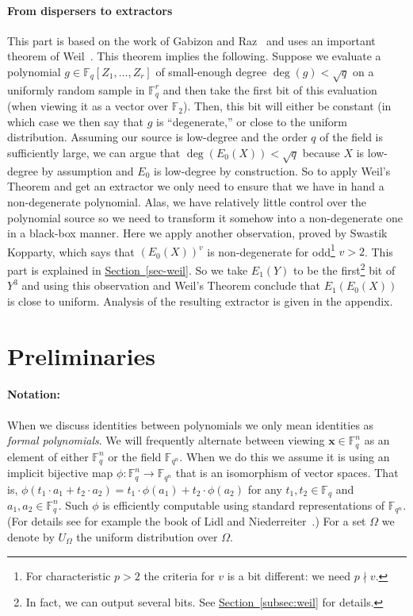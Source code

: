 \documentclass[10pt]{article}
\theoremstyle{definition}
\numberwithin{equation}{section}
\newcommand{\expref}[2]{\texorpdfstring{\hyperref[#2]{#1~\ref{#2}}}{#1~\ref{#2}}}
\newcommand{\F}{\mathbb F_q}
\newcommand{\Fn}{\mathbb F_{q^n}}
\newcommand{\x}{\textbf{x}}
\begin{document}
\paragraph{From dispersers to extractors}
This part is based on the work of Gabizon and Raz~\cite{GR08} and uses
%
an important theorem of Weil~\cite{Weil48}.
This theorem implies the following. Suppose we evaluate a polynomial $g\in \F[Z_1,\ldots,Z_r]$ of small-enough degree $\deg(g)<\sqrt q $
on a uniformly random sample in $\F^r$ and then take the first bit of this evaluation (when viewing it as a vector over $\mathbb{F}_2$).
%
%
%
Then, this bit will either be constant (in which case we then say
%
%
that $g$ is ``degenerate,'' or close to the uniform distribution.
%
 Assuming our source is low-degree and the
%
%
order $q$ of the field
is sufficiently large, we %
can argue that $\deg(E_0(X))<\sqrt q$ because $X$ is
low-degree by assumption and $E_0$ is low-degree by construction. So to apply Weil's Theorem and get an extractor we only need to ensure that we have in hand
a non-degenerate polynomial. Alas, we have relatively little control over the polynomial source so
we %
need to transform it somehow into a non-degenerate one in a
 black-box manner.
Here we apply another observation,
%
%
proved by Swastik Kopparty,
which says that $(E_0(X))^v$ is non-degenerate for
odd\footnote{For characteristic $p>2$ the criteria for $v$ is a bit different:
we need
%
$p\nmid v$.} $v>2$.
 This part is explained in \expref{Section}{sec-weil}. So we take $E_1(Y)$ to be the first\footnote{In fact, we can  output several bits. See \expref{Section}{subsec:weil} for details.}  bit of $Y^3$ and using this observation and Weil's Theorem conclude
 that $E_1(E_0(X))$ is close to uniform. Analysis of the resulting extractor is given in the appendix.

\section{Preliminaries}\label{sec-prelim}
\paragraph{Notation:}
When we discuss identities between polynomials we
only mean identities as \emph{formal polynomials}.
We will frequently alternate between viewing $\x\in \F^n$ as an element of
either $\F^n$ or the field $\Fn$.
When we do this we assume it is using an implicit bijective map $\phi:\F^n\to \Fn$ that is
an isomorphism of vector spaces.
That is, $\phi(t_1\cdot a_1+t_2\cdot a_2)= t_1\cdot \phi(a_1) + t_2\cdot \phi(a_2)$
for any $t_1,t_2\in \F$ and $a_1,a_2\in \F^n$.
Such $\phi$ is efficiently computable using standard representations of $\Fn$.
(For details see for example the book of Lidl and Niederreiter~\cite{LN94}.)
For a set $\Omega$ we denote by $U_{\Omega}$ the uniform distribution
%
over $\Omega$.
\end{document}
